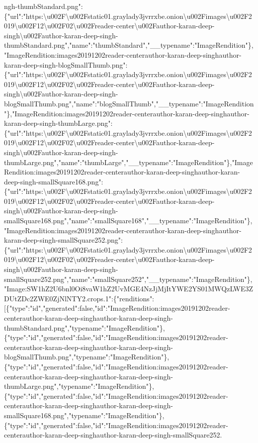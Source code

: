 ngh-thumbStandard.png":\{"url":"https:\textbackslash{}u002F\textbackslash{}u002Fstatic01.graylady3jvrrxbe.onion\textbackslash{}u002Fimages\textbackslash{}u002F2019\textbackslash{}u002F12\textbackslash{}u002F02\textbackslash{}u002Freader-center\textbackslash{}u002Fauthor-karan-deep-singh\textbackslash{}u002Fauthor-karan-deep-singh-thumbStandard.png","name":"thumbStandard","\_\_typename":"ImageRendition"\},"ImageRendition:images20191202reader-centerauthor-karan-deep-singhauthor-karan-deep-singh-blogSmallThumb.png":\{"url":"https:\textbackslash{}u002F\textbackslash{}u002Fstatic01.graylady3jvrrxbe.onion\textbackslash{}u002Fimages\textbackslash{}u002F2019\textbackslash{}u002F12\textbackslash{}u002F02\textbackslash{}u002Freader-center\textbackslash{}u002Fauthor-karan-deep-singh\textbackslash{}u002Fauthor-karan-deep-singh-blogSmallThumb.png","name":"blogSmallThumb","\_\_typename":"ImageRendition"\},"ImageRendition:images20191202reader-centerauthor-karan-deep-singhauthor-karan-deep-singh-thumbLarge.png":\{"url":"https:\textbackslash{}u002F\textbackslash{}u002Fstatic01.graylady3jvrrxbe.onion\textbackslash{}u002Fimages\textbackslash{}u002F2019\textbackslash{}u002F12\textbackslash{}u002F02\textbackslash{}u002Freader-center\textbackslash{}u002Fauthor-karan-deep-singh\textbackslash{}u002Fauthor-karan-deep-singh-thumbLarge.png","name":"thumbLarge","\_\_typename":"ImageRendition"\},"ImageRendition:images20191202reader-centerauthor-karan-deep-singhauthor-karan-deep-singh-smallSquare168.png":\{"url":"https:\textbackslash{}u002F\textbackslash{}u002Fstatic01.graylady3jvrrxbe.onion\textbackslash{}u002Fimages\textbackslash{}u002F2019\textbackslash{}u002F12\textbackslash{}u002F02\textbackslash{}u002Freader-center\textbackslash{}u002Fauthor-karan-deep-singh\textbackslash{}u002Fauthor-karan-deep-singh-smallSquare168.png","name":"smallSquare168","\_\_typename":"ImageRendition"\},"ImageRendition:images20191202reader-centerauthor-karan-deep-singhauthor-karan-deep-singh-smallSquare252.png":\{"url":"https:\textbackslash{}u002F\textbackslash{}u002Fstatic01.graylady3jvrrxbe.onion\textbackslash{}u002Fimages\textbackslash{}u002F2019\textbackslash{}u002F12\textbackslash{}u002F02\textbackslash{}u002Freader-center\textbackslash{}u002Fauthor-karan-deep-singh\textbackslash{}u002Fauthor-karan-deep-singh-smallSquare252.png","name":"smallSquare252","\_\_typename":"ImageRendition"\},"Image:SW1hZ2U6bnl0Oi8vaW1hZ2UvMGE4NzJjMjItYWE2YS01MWQzLWE3ZDUtZDc2ZWE0ZjNlNTY2.crops.1":\{"renditions":{[}\{"type":"id","generated":false,"id":"ImageRendition:images20191202reader-centerauthor-karan-deep-singhauthor-karan-deep-singh-thumbStandard.png","typename":"ImageRendition"\},\{"type":"id","generated":false,"id":"ImageRendition:images20191202reader-centerauthor-karan-deep-singhauthor-karan-deep-singh-blogSmallThumb.png","typename":"ImageRendition"\},\{"type":"id","generated":false,"id":"ImageRendition:images20191202reader-centerauthor-karan-deep-singhauthor-karan-deep-singh-thumbLarge.png","typename":"ImageRendition"\},\{"type":"id","generated":false,"id":"ImageRendition:images20191202reader-centerauthor-karan-deep-singhauthor-karan-deep-singh-smallSquare168.png","typename":"ImageRendition"\},\{"type":"id","generated":false,"id":"ImageRendition:images20191202reader-centerauthor-karan-deep-singhauthor-karan-deep-singh-smallSquare252.